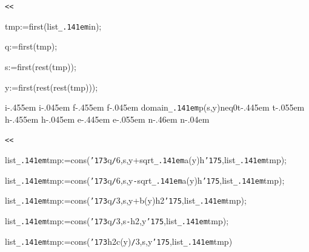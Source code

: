 \documentclass{article}
\begin{document}
\noindent
\mbox{}{\tt\mc {}\charwd}{\tt <}{\tt <}

\noindent
\mbox{}{\tt\mc {}\charwd}tmp{\tt\mc {}\charwd}:={\tt\mc {}\charwd}first(list{\tt\_\kern.141em}in);

\noindent
\mbox{}{\tt\mc {}\charwd}q{\tt\mc {}\charwd}:={\tt\mc {}\charwd}first(tmp);

\noindent
\mbox{}{\tt\mc {}\charwd}s{\tt\mc {}\charwd}:={\tt\mc {}\charwd}first(rest(tmp));

\noindent
\mbox{}{\tt\mc {}\charwd}y{\tt\mc {}\charwd}:={\tt\mc {}\charwd}first(rest(rest(tmp)));

\noindent
\mbox{}{\tt\mc {}\charwd}i\kern-.455em i\kern-.045em f\kern-.455em f\kern-.045em {\tt\mc {}\charwd}domain{\tt\_\kern.141em}p(s,{\tt\mc {}\charwd}y){\tt\mc {}\charwd}neq{\tt\mc {}\charwd}0{\tt\mc {}\charwd}t\kern-.445em t\kern-.055em h\kern-.455em h\kern-.045em e\kern-.445em e\kern-.055em n\kern-.46em n\kern-.04em 

\noindent
\mbox{}{\tt\mc {}\charwd}{\tt <}{\tt <}

\noindent
\mbox{}{\tt\mc {}\charwd}list{\tt\_\kern.141em}tmp{\tt\mc {}\charwd}:={\tt\mc {}\charwd}cons({\tt\char'173}q{\tt /}6,{\tt\mc {}\charwd}s,{\tt\mc {}\charwd}y+sqrt{\tt\_\kern.141em}a(y){\tt *}h{\tt\char'175},{\tt\mc {}\charwd}list{\tt\_\kern.141em}tmp);

\noindent
\mbox{}{\tt\mc {}\charwd}list{\tt\_\kern.141em}tmp{\tt\mc {}\charwd}:={\tt\mc {}\charwd}cons({\tt\char'173}q{\tt /}6,{\tt\mc {}\charwd}s,{\tt\mc {}\charwd}y{\tt -}sqrt{\tt\_\kern.141em}a(y){\tt *}h{\tt\char'175},{\tt\mc {}\charwd}list{\tt\_\kern.141em}tmp);

\noindent
\mbox{}{\tt\mc {}\charwd}list{\tt\_\kern.141em}tmp{\tt\mc {}\charwd}:={\tt\mc {}\charwd}cons({\tt\char'173}q{\tt /}3,{\tt\mc {}\charwd}s,{\tt\mc {}\charwd}y+b(y){\tt *}h{\tt *}{\tt *}2{\tt\char'175},{\tt\mc {}\charwd}list{\tt\_\kern.141em}tmp);

\noindent
\mbox{}{\tt\mc {}\charwd}list{\tt\_\kern.141em}tmp{\tt\mc {}\charwd}:={\tt\mc {}\charwd}cons({\tt\char'173}q{\tt /}3,{\tt\mc {}\charwd}s{\tt -}h{\tt *}{\tt *}2,{\tt\mc {}\charwd}y{\tt\char'175},{\tt\mc {}\charwd}list{\tt\_\kern.141em}tmp);

\noindent
\mbox{}{\tt\mc {}\charwd}list{\tt\_\kern.141em}tmp{\tt\mc {}\charwd}:={\tt\mc {}\charwd}cons({\tt\char'173}h{\tt *}{\tt *}2{\tt *}c(y){\tt /}3,{\tt\mc {}\charwd}s,{\tt\mc {}\charwd}y{\tt\char'175},{\tt\mc {}\charwd}list{\tt\_\kern.141em}tmp)
\end{document}
